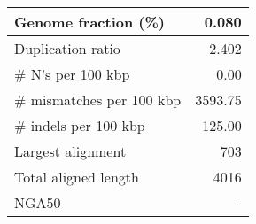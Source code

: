 \documentclass[12pt,a4paper]{article}
\begin{document}
\begin{table}[ht]
\begin{center}
\begin{tabular}{|l*{1}{|r}|}
Genome fraction (\%) & 0.080 \\ \hline
Duplication ratio & 2.402 \\ \hline
\# N's per 100 kbp & 0.00 \\ \hline
\# mismatches per 100 kbp & 3593.75 \\ \hline
\# indels per 100 kbp & 125.00 \\ \hline
Largest alignment & 703 \\ \hline
Total aligned length & 4016 \\ \hline
NGA50 & - \\ \hline
\end{tabular}
\end{center}
\end{table}
\end{document}
